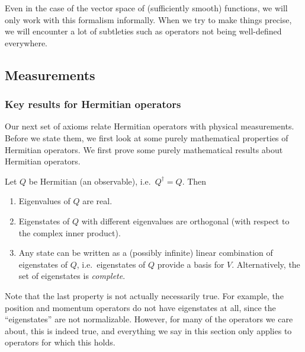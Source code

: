 \documentclass[a4paper]{article}
\begin{document}
Even in the case of the vector space of (sufficiently smooth) functions, we will only work with this formalism informally. When we try to make things precise, we will encounter a lot of subtleties such as operators not being well-defined everywhere.

\subsection{Measurements}
\subsubsection*{Key results for Hermitian operators}
Our next set of axioms relate Hermitian operators with physical measurements. Before we state them, we first look at some purely mathematical properties of Hermitian operators.
We first prove some purely mathematical results about Hermitian operators.
\begin{prop}
  Let $Q$ be Hermitian (an observable), i.e.\ $Q^\dagger = Q$. Then
  \begin{enumerate}
    \item Eigenvalues of $Q$ are real.
    \item Eigenstates of $Q$ with different eigenvalues are orthogonal (with respect to the complex inner product).
    \item Any state can be written as a (possibly infinite) linear combination of eigenstates of $Q$, i.e.\ eigenstates of $Q$ provide a basis for $V$. Alternatively, the set of eigenstates is \emph{complete}.
  \end{enumerate}
\end{prop}
Note that the last property is not actually necessarily true. For example, the position and momentum operators do not have eigenstates at all, since the ``eigenstates'' are not normalizable. However, for many of the operators we care about, this is indeed true, and everything we say in this section only applies to operators for which this holds.
\end{document}
